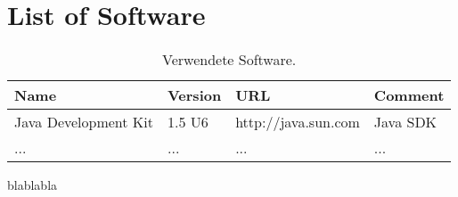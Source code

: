 \chapter*{List of Software}
\label{sec:software}
\begin{table}[htb]
	\centering
		\begin{tabular}{|l|l||l|l|}
		\hline
			\bfseries{Name} & \bfseries{Version} & \bfseries{URL} & \bfseries{Comment}\\
		\hline
		\hline
			Java Development Kit & 1.5 U6 & http://java.sun.com& Java SDK\\
		\hline
	... & ... & ... & ... \\
		\hline
		\end{tabular}
	\caption{Verwendete Software.}
	\label{tab:VerwendeteSoftware}
\end{table}

blablabla